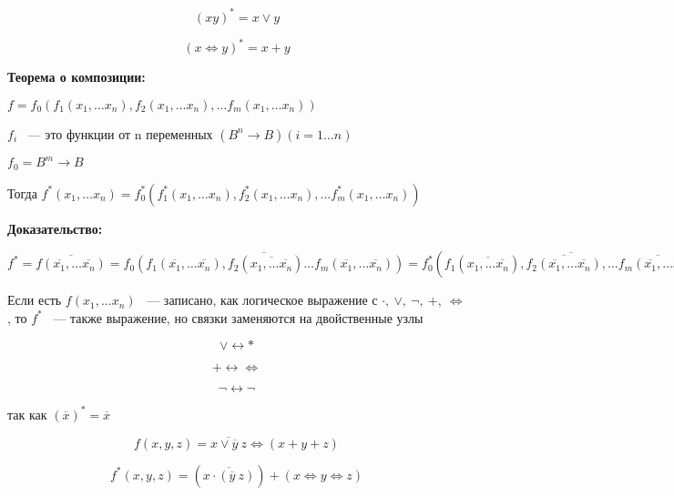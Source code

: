 \documentclass[russian]{lecture-notes}
\begin{document}
\begin{sloppypar}
        \begin{corollary}
            $$(xy)^* = x \lor y$$

            $$(x \Leftrightarrow y)^* = x + y$$
        \end{corollary}

        \textbf{Теорема о композиции:}

        $f = f_0(f_1(x_1, \dots x_n), f_2(x_1, \dots x_n), \dots f_m(x_1, \dots x_n))$

        $f_i$ ~--- это функции от n переменных $(B^n \rightarrow B) (i = 1 \dots n)$

        $f_0 = B^m \rightarrow B$

        Тогда $f^*(x_1, \dots x_n) = f^{*}_{0}(f^{*}_{1}(x_1, \dots x_n), f^{*}_{2}(x_1, \dots x_n), \dots f^{*}_{m}(x_1, \dots x_n))$

        \textbf{Доказательство:}

        $f^* = \overline{f(\overline{x_1}, \dots \overline{x_n})} =  \overline{f_0(f_1(\overline{x_1}, \dots \overline{x_n}), f_2(\overline{x_1, \dots \overline{x_n}}) \dots f_m(\overline{x_1}, \dots \overline{x_n}))} = f_0^*(\overline{f_1(\overline{x_1, \dots \overline{x_n}}), \overline{f_2(\overline{x_1}, \dots \overline{x_n})}, \dots \overline{f_m(\overline{x_1}, \dots \overline{x_n})}}) $

        \begin{corollary}
            Если есть $f(x_1, \dots x_n)$ ~--- записано, как логическое выражение с $\cdot, \: \lor, \: \neg, \: +, \: \Leftrightarrow$, то $f^*$ ~--- также выражение, но связки заменяются на двойственные узлы

            $$\lor \leftrightarrow *$$

            $$+ \leftrightarrow \Leftrightarrow$$

            $$\neg \leftrightarrow \neg$$

            так как $(\overline{x})^* = \overline{x}$
        \end{corollary}

        \begin{example}

            $$f(x, y, z) = \overline{x \lor \overline{y} \: z} \Leftrightarrow (x + y + z)$$

            $$f^*(x, y, z) = (\overline{x \cdot (\overline{y} \: z)}) + (x \Leftrightarrow y \Leftrightarrow z)$$
        \end{example}

        \begin{example}


\end{example}
\end{sloppypar}
\end{document}
